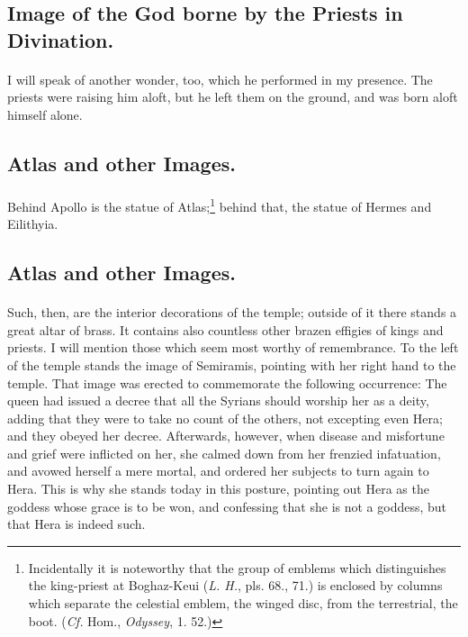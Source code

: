\documentclass[a4paper, 11pt, oneside, polutonikogreek, english]{article}
\begin{document}
\subsection{Image of the God borne by the Priests in Divination.}
\paragraph{}
I will speak of another wonder, too, which he performed in my presence. The priests were raising him aloft, but he left them on the ground, and was born aloft himself alone.

\subsection{Atlas and other Images.}
\paragraph{}
Behind Apollo is the statue of Atlas;\footnote{Incidentally it is noteworthy that the group of emblems which distinguishes the king-priest at Boghaz-Keui (\emph{L. H.}, pls. 68., 71.) is enclosed by columns which separate the celestial emblem, the winged disc, from the terrestrial, the boot. (\emph{Cf.} Hom., \emph{Odyssey}, 1. 52.)} behind that, the statue of Hermes and Eilithyia.

\subsection{Atlas and other Images.}
\paragraph{}
Such, then, are the interior decorations of the temple; outside of it there stands a great altar of brass. It contains also countless other brazen effigies of kings and priests. I will mention those which seem most worthy of remembrance. To the left of the temple stands the image of Semiramis, pointing with her right hand to the temple. That image was erected to commemorate the following occurrence: The queen had issued a decree that all the Syrians should worship her as a deity, adding that they were to take no count of the others, not excepting even Hera; and they obeyed her decree. Afterwards, however, when disease and misfortune and grief were inflicted on her, she calmed down from her frenzied infatuation, and avowed herself a mere mortal, and ordered her subjects to turn again to Hera. This is why she stands today in this posture, pointing out Hera as the goddess whose grace is to be won, and confessing that she is not a goddess, but that Hera is indeed such.
\end{document}
